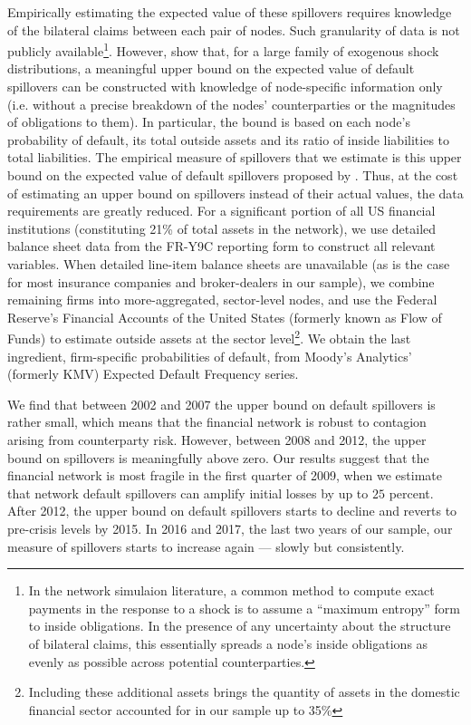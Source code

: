 Empirically estimating the expected value of these spillovers requires knowledge of the bilateral claims between each pair of nodes. Such granularity of data is not publicly available\footnote{In the network simulaion literature, a common method to compute exact payments in the response to a shock is to assume a ``maximum entropy'' form to inside obligations. In the presence of any uncertainty about the structure of bilateral claims, this essentially spreads a node's inside obligations as evenly as possible across potential counterparties.}. However, \citet{glasserman2015likely} show that, for a large family of exogenous shock distributions, a meaningful upper bound on the expected value of default spillovers can be constructed with knowledge of node-specific information only (i.e. without a precise breakdown of the nodes' counterparties or the magnitudes of obligations to them). In particular, the bound is based on each node's probability of default, its total outside assets and its ratio of inside liabilities to total liabilities. The empirical measure of spillovers that we estimate is this upper bound on the expected value of default spillovers proposed by \citet{glasserman2015likely}. Thus, at the cost of estimating an upper bound on spillovers instead of their actual values, the data requirements are greatly reduced. For a significant portion of all US financial institutions (constituting 21\% of total assets in the network), we use detailed balance sheet data from the FR-Y9C reporting form to construct all relevant variables. When detailed line-item balance sheets are unavailable (as is the case for most insurance companies and broker-dealers in our sample), we combine remaining firms into more-aggregated, sector-level nodes, and use the Federal Reserve's Financial Accounts of the United States (formerly known as Flow of Funds) to estimate outside assets at the sector level\footnote{Including these additional assets brings the quantity of assets in the domestic financial sector accounted for in our sample up to 35\%}. We obtain the last ingredient, firm-specific probabilities of default, from Moody’s Analytics' (formerly KMV) Expected Default Frequency series.

We find that between 2002 and 2007 the upper bound on default spillovers is rather small, which means that the financial network is robust to contagion arising from counterparty risk. However, between 2008 and 2012, the upper bound on spillovers is meaningfully above zero. Our results suggest that the financial network is most fragile in the first quarter of 2009, when we estimate that network default spillovers can amplify initial losses by up to $25$ percent. After 2012, the upper bound on default spillovers starts to decline and reverts to pre-crisis levels by 2015. In 2016 and 2017, the last two years of our sample, our measure of spillovers starts to increase again --- slowly but consistently.

